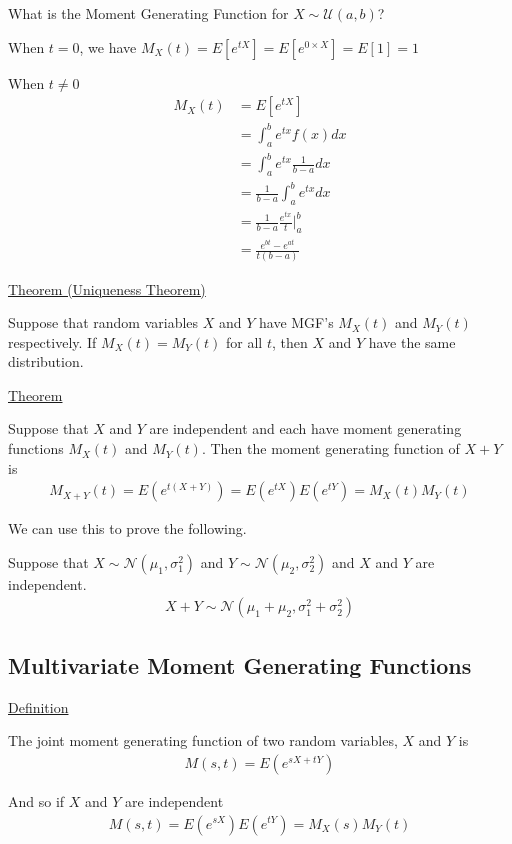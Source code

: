 \documentclass{article}
\begin{document}
What is the Moment Generating Function for $X \sim \mathcal{U}(a,b)$?

When $t =0 $, we have $M_X(t) = E[e^{tX}] = E[e^{0\times X}] = E[1] = 1$

When $t \ne 0$
\begin{align*}
    M_X(t) &= E[e^{tX}] \\
    &= \int_a^b e^{tx}f(x)dx \\
    &= \int_a^b e^{tx}\frac{1}{b-a}dx \\
    &= \frac{1}{b-a}\int_a^b e^{tx}dx \\
    &= \frac{1}{b-a} \frac{e^{tx}}{t} \vert_a^b \\
    &= \frac{e^{bt}-e^{at}}{t(b-a)}
\end{align*}

\underline{Theorem (Uniqueness Theorem)}

Suppose that random variables $X$ and $Y$ have MGF's $M_X(t)$ and $M_Y(t)$ respectively. If $M_X(t) = M_Y(t)$ for all $t$, then $X$ and $Y$ have the same distribution. 

\underline{Theorem}

Suppose that $X$ and $Y$ are independent and each have moment generating functions $M_X(t)$ and $M_Y(t)$. Then the moment generating function of $X + Y$ is 
\begin{align*}
    M_{X + Y}(t) = E\left(e^{t(X + Y)}\right) = E\left(e^{tX}\right) E\left(e^{tY}\right) = M_X(t)M_Y(t)
\end{align*}

We can use this to prove the following. 

Suppose that $X \sim \mathcal{N}(\mu_1, \sigma_1^2)$ and $Y \sim \mathcal{N}(\mu_2, \sigma_2^2)$ and $X$ and $Y$ are independent. 
\begin{align*}
    X + Y \sim \mathcal{N}(\mu_1 + \mu_2, \sigma_1^2 + \sigma_2^2)
\end{align*}

\subsection{Multivariate Moment Generating Functions}

\underline{Definition}

The joint moment generating function of two random variables, $X$ and $Y$ is
\begin{align*}
    M(s,t) = E\left(e^{sX + tY}\right)
\end{align*}

And so if $X$ and $Y$ are independent
\begin{align*}
    M(s,t) = E\left(e^{sX}\right)E\left(e^{tY}\right) = M_X(s)M_Y(t)
\end{align*}
\end{document}
